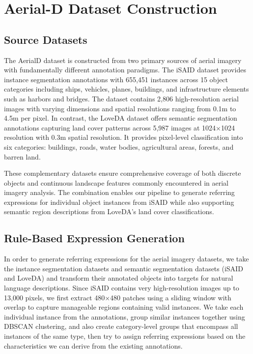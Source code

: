 
\section{Aerial-D Dataset Construction}
\label{sec:approach}

\subsection{Source Datasets}

The AerialD dataset is constructed from two primary sources of aerial imagery with fundamentally different annotation paradigms. The iSAID dataset provides instance segmentation annotations with 655,451 instances across 15 object categories including ships, vehicles, planes, buildings, and infrastructure elements such as harbors and bridges. The dataset contains 2,806 high-resolution aerial images with varying dimensions and spatial resolutions ranging from 0.1m to 4.5m per pixel. In contrast, the LoveDA dataset offers semantic segmentation annotations capturing land cover patterns across 5,987 images at 1024×1024 resolution with 0.3m spatial resolution. It provides pixel-level classification into six categories: buildings, roads, water bodies, agricultural areas, forests, and barren land.

These complementary datasets ensure comprehensive coverage of both discrete objects and continuous landscape features commonly encountered in aerial imagery analysis. The combination enables our pipeline to generate referring expressions for individual object instances from iSAID while also supporting semantic region descriptions from LoveDA's land cover classifications.

\subsection{Rule-Based Expression Generation}

In order to generate referring expressions for the aerial imagery datasets, we take the instance segmentation datasets and semantic segmentation datasets (iSAID and LoveDA) and transform their annotated objects into targets for natural language descriptions. Since iSAID contains very high-resolution images up to 13,000 pixels, we first extract 480×480 patches using a sliding window with overlap to capture manageable regions containing valid instances. We take each individual instance from the annotations, group similar instances together using DBSCAN clustering, and also create category-level groups that encompass all instances of the same type, then try to assign referring expressions based on the characteristics we can derive from the existing annotations.

